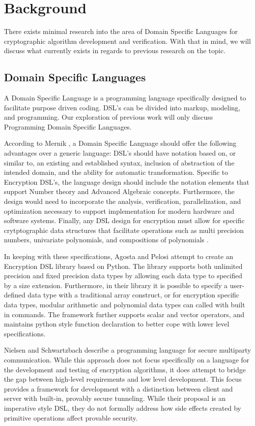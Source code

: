 \section{Background}
There exists minimal research into the area of Domain Specific Languages for cryptographic algorithm development and verification. With that in mind, we will discuss what currently exists in regards to previous research on the topic.

\subsection{Domain Specific Languages}
 A Domain Specific Language is a programming language specifically designed to facilitate purpose driven coding. DSL's can be divided into markup, modeling, and programming. Our exploration of previous work will only discuss Programming Domain Specific Languages. 

According to Mernik \cite{Mernik}, a Domain Specific Language should offer the following advantages over a generic language: DSL's should have notation based on, or similar to, an existing and established syntax, inclusion of abstraction of the intended domain, and the ability for automatic transformation. Specific to Encryption DSL's, the language design should include the notation elements that support Number theory and Advanced Algebraic concepts. Furthermore, the design would need to incorporate the analysis, verification, parallelization, and optimization necessary to support implementation for modern hardware and software systems. Finally, any DSL design for encryption must allow for specific crytptographic data structures that facilitate operations such as multi precision numbers, univariate polynomials, and compositions of polynomials \cite{Agosta}.

In keeping with these specifications, Agosta and Pelosi \cite{Agosta} attempt to create an  Encryption DSL library based on Python. The library supports both unlimited precision and fixed precision data types by allowing each data type to specified by a size extension. Furthermore, in their library it is possible to specify a user-defined data type with a traditional array construct, or for encryption specific data types, modular arithmetic and polynomial data types can called with built in commands. The framework further supports scalar and vector operators, and maintains python style function declaration to better cope with lower level specifications.

Nielsen and Schwartzbach \cite{Nielsen} describe a programming language for secure multiparty communication. While this approach does not focus specifically on a language for the development and testing  of encryption algorithms, it does attempt to bridge the gap between high-level requirements and low level development. This focus provides a framework for development with a distinction between client and server with built-in, provably secure tunneling.  While their proposal is an imperative style DSL, they do not formally address how side effects created by primitive operations affect provable security.

